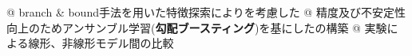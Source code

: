 \begin{tcolorbox}[title={\Large アプローチ}]
	\begin{easylist}[itemize]
	@ branch \& bound手法を用いた特徴探索によりを考慮した{}
	@ 精度及び不安定性向上のためアンサンブル学習({\bf 勾配ブースティング})を基にしたの構築
	@ 実験による線形、非線形モデル間の比較
	\end{easylist}
\end{tcolorbox}
